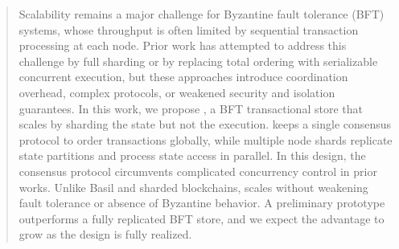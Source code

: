 \begin{abstract}
Scalability remains a major challenge for Byzantine fault tolerance (BFT) systems, whose throughput is often limited by sequential transaction processing at each node.
Prior work has attempted to address this challenge by full sharding or by replacing total ordering with serializable concurrent execution, but these approaches introduce coordination overhead, complex protocols, or weakened security and isolation guarantees.
In this work, we propose \sys, a BFT transactional store that scales by sharding the state but not the execution.
\sys keeps a single consensus protocol to order transactions globally, while multiple node shards replicate state partitions and process state access in parallel.
In this design, the consensus protocol circumvents complicated concurrency control in prior works.
Unlike Basil and sharded blockchains, \sys scales without weakening fault tolerance or absence of Byzantine behavior.
A preliminary prototype outperforms a fully replicated BFT store, and we expect the advantage to grow as the design is fully realized.
\end{abstract}